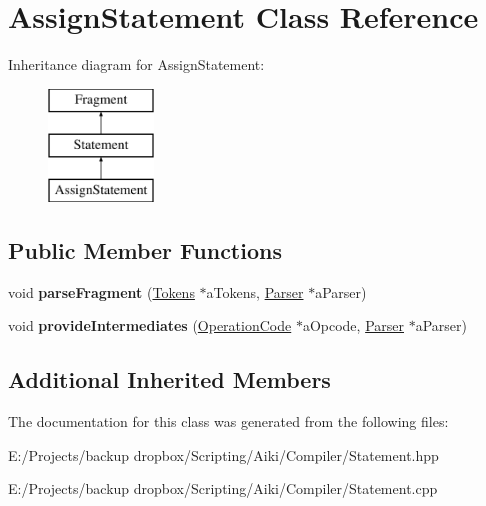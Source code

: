 \hypertarget{a00003}{\section{Assign\+Statement Class Reference}
\label{a00003}
}
Inheritance diagram for Assign\+Statement\+:\begin{figure}[H]
\begin{center}
\leavevmode
\includegraphics[height=3.000000cm]{d1/d7c/a00003}
\end{center}
\end{figure}
\subsection*{Public Member Functions}
\begin{DoxyCompactItemize}
\item 
\hypertarget{a00003_a6960b0f10c9e5301befe2ab8da9fbd8e}{void {\bfseries parse\+Fragment} (\hyperlink{a00026}{Tokens} $\ast$a\+Tokens, \hyperlink{a00017}{Parser} $\ast$a\+Parser)}\label{a00003_a6960b0f10c9e5301befe2ab8da9fbd8e}

\item 
\hypertarget{a00003_aab1c8b0b2f087014fc096474bc2854ab}{void {\bfseries provide\+Intermediates} (\hyperlink{a00015}{Operation\+Code} $\ast$a\+Opcode, \hyperlink{a00017}{Parser} $\ast$a\+Parser)}\label{a00003_aab1c8b0b2f087014fc096474bc2854ab}

\end{DoxyCompactItemize}
\subsection*{Additional Inherited Members}


The documentation for this class was generated from the following files\+:\begin{DoxyCompactItemize}
\item 
E\+:/\+Projects/backup dropbox/\+Scripting/\+Aiki/\+Compiler/Statement.\+hpp\item 
E\+:/\+Projects/backup dropbox/\+Scripting/\+Aiki/\+Compiler/Statement.\+cpp\end{DoxyCompactItemize}
